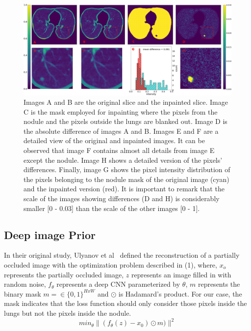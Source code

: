 \documentclass[runningheads]{llncs}
\begin{document}
\begin{figure}
\includegraphics[width=\textwidth]{inpainting-difference-caption.png}
\caption{Images A and B are the original slice and the inpainted slice. Image C is the mask employed for inpainting where the pixels from the nodule and the pixels outside the lungs are blanked out. Image D is the absolute difference of images A and B. Images E and F are a detailed view of the original and inpainted images. It can be observed that image F contains almost all details from image E except the nodule. Image H shows a detailed version of the pixels' differences. Finally, image G shows the pixel intensity distribution of the pixels belonging to the nodule mask of the original image (cyan) and the inpainted version (red). It is important to remark that the scale of the images showing differences (D and H) is considerably smaller [0 - 0.03] than the scale of the other images [0 - 1].} \label{fig1}
\end{figure}

\subsection{Deep image Prior}
In their original study, Ulyanov et al~\cite{DBLP:journals/corr/abs-1711-10925} defined the reconstruction of a partially occluded image with the optimization problem described in (1), where, \(x_o\) represents the partially occluded image, \(z\) represents an image filled in with random noise, \(f_\theta\) represents a deep CNN parameterized by \(\theta\), \(m\) represents the binary mask \(m = \in \{0, 1\}^{HxW} \) and \(\odot\) is Hadamard's product. For our case, the mask indicates that the loss function should only consider those pixels inside the lungs but not the pixels inside the nodule. 
\begin{equation}
min_\theta  \|(f_\theta(z) - x_0) \odot m) \|^2
\end{equation}
\end{document}
